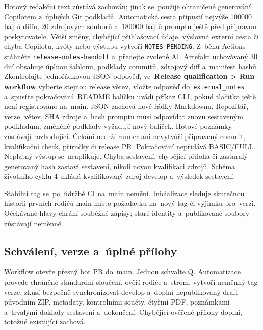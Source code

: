 \documentclass[11pt,a4paper]{article}
\newcommand{\filepath}[1]{\path{#1}}
\newcommand{\ui}[1]{\textbf{#1}}
\newcommand{\codeword}[1]{\nolinkurl{#1}}
\begin{document}
Hotový redakční text zůstává zachován; jinak se~použije ohraničené
generování Copilotem z~úplných Git podkladů. Automatická cesta připustí nejvýše
100000 bajtů diffu, 20 zdrojových souborů a~180000 bajtů promptu ještě před
přípravou poskytovatele. Větší změny, chybějící přihlašovací údaje, výslovná
externí cesta či chyba Copilotu, kvóty nebo výstupu vytvoří
\codeword{NOTES_PENDING}. Z~běhu Actions stáhněte
\codeword{release-notes-handoff} a~předejte \filepath{prompt.txt} zvolené AI.
Artefakt uchovávaný 30 dní obsahuje úplnou šablonu, podklady commitů, zdrojový
diff a~manifest hashů. Zkontrolujte jednořádkovou JSON odpověď, ve~\ui{Release
qualification > Run workflow} vyberte stejnou release větev, vložte odpověď
do~\codeword{external_notes} a~spusťte pokračování. README balíčku uvádí
příkaz CLI, pokud tlačítko ještě není registrováno na~main. JSON zachová nové
řádky Markdownu. Repozitář, verze, větev, SHA zdroje a~hash promptu musí
odpovídat znovu sestaveným podkladům; změněné podklady vyžadují nový balíček.
Hotové poznámky zůstávají rozhodující. Čekání nedrží runner ani nevytváří
připravený commit, kvalifikační check, příručky či release PR. Pokračování
nepřidává BASIC/FULL. Neplatný výstup se~neaplikuje.
Chyba sestavení, chybějící příloha či zastaralý generovaný hash zastaví
sestavení, nikoli novou kvalifikaci zdrojů. Schéma životního cyklu 4 ukládá
kvalifikovaný zdroj develop a~výsledek sestavení.

Stabilní tag se~po~údržbě CI na~main nemění. Inicializace sleduje skutečnou
historii prvních rodičů main místo požadavku na~nový tag či výjimku pro~verzi.
Očekávané hlavy chrání souběžné zápisy; staré identity a~publikované soubory
zůstávají neměnné.

\subsection{Schválení, verze a~úplné přílohy}

Workflow otevře přesný bot PR do~main. Jednou schvalte Q.
Automatizace provede chráněné standardní sloučení, ověří rodiče a~strom,
vytvoří neměnný tag verze, zkusí bezpečně synchronizovat develop a~doplní
nepublikovaný draft původním ZIP, metadaty, kontrolními součty, čtyřmi PDF,
poznámkami a~trvalými doklady sestavení a~dokončení.
Chybějící ověřené přílohy doplní, totožné existující zachová.
\end{document}
